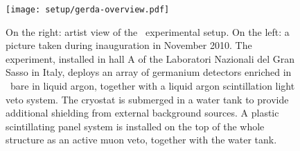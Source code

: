 \begin{figure}
  \centering
  \texttt{[image: setup/gerda-overview.pdf]}
  \caption{%
    On the right: artist view of the \gerda\ experimental setup. On the left: a picture
    taken during inauguration in November 2010. The experiment, installed in hall A of
    the Laboratori Nazionali del Gran Sasso in Italy, deploys an array of germanium detectors
    enriched in \gesix\ bare in liquid argon, together with a liquid argon scintillation
    light veto system. The cryostat is submerged in a water tank to provide additional
    shielding from external background sources. A plastic scintillating panel system is
    installed on the top of the whole structure as an active muon veto, together with the
    water tank.
  }\label{fig:setup:overview}
\end{figure}

